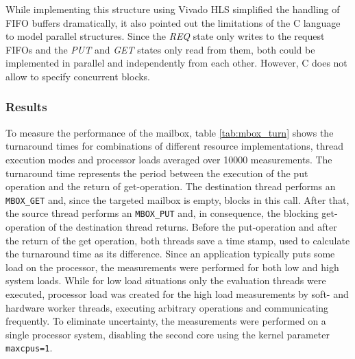 While implementing this structure using Vivado HLS simplified the handling of
\ac{FIFO} buffers dramatically, it also pointed out the limitations of the C
language to model parallel structures. Since the \emph{REQ} state only writes
to the request \acp{FIFO} and the \emph{PUT} and \emph{GET} states only read
from them, both could be implemented in parallel and independently from each
other. However, C does not allow to specify concurrent blocks.

\subsubsection{Results}
To measure the performance of the mailbox, table \ref{tab:mbox_turn} shows the
turnaround times for combinations of different resource implementations,
thread execution modes and processor loads averaged over 10000 measurements.
The turnaround time represents the period between the execution of the put
operation and the return of get-operation. The destination thread performs an
\lstinline{MBOX_GET} and, since the targeted mailbox is empty, blocks in this
call. After that, the source thread performs an \lstinline{MBOX_PUT} and, in
consequence, the blocking get-operation of the destination thread returns.
Before the put-operation and after the return of the get operation, both
threads save a time stamp, used to calculate the turnaround time as its
difference. Since an application typically puts some load on the processor,
the measurements were performed for both low and high system loads. While for
low load situations only the evaluation threads were executed, processor load
was created for the high load measurements by soft- and hardware worker
threads, executing arbitrary operations and communicating frequently. To
eliminate uncertainty, the measurements were performed on a single processor
system, disabling the second core using the kernel parameter
\lstinline{maxcpus=1}.

